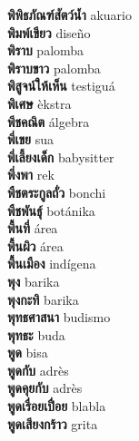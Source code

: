 \textbf{ พิพิธภัณฑ์สัตว์น้ำ  } akuario \\
\textbf{ พิมพ์เขียว  } diseño \\
\textbf{ พิราบ  } palomba \\
\textbf{ พิราบขาว  } palomba \\
\textbf{ พิสูจน์ให้เห็น  } testiguá \\
\textbf{ พิเศษ  } èkstra \\
\textbf{ พีชคณิต  } álgebra \\
\textbf{ พี่เขย  } sua \\
\textbf{ พี่เลี้ยงเด็ก  } babysitter \\
\textbf{ พึ่งพา  } rek \\
\textbf{ พืชตระกูลถั่ว  } bonchi \\
\textbf{ พืชพันธุ์  } botánika \\
\textbf{ พื้นที่  } área \\
\textbf{ พื้นผิว  } área \\
\textbf{ พื้นเมือง  } indígena \\
\textbf{ พุง  } barika \\
\textbf{ พุงกะทิ  } barika \\
\textbf{ พุทธศาสนา  } budismo \\
\textbf{ พุทธะ  } buda \\
\textbf{ พูด  } bisa \\
\textbf{ พูดกับ  } adrès \\
\textbf{ พูดคุยกับ  } adrès \\
\textbf{ พูดเรื่อยเปื่อย  } blabla \\
\textbf{ พูดเสียงกร้าว  } grita \\
